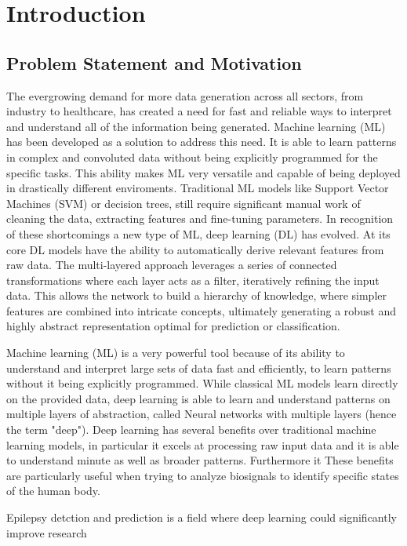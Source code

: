 \section{Introduction}

\subsection{Problem Statement and Motivation}







The evergrowing demand for more data generation across all sectors, from industry to healthcare,
has created a need for fast and reliable ways to interpret and understand all of the information 
being generated. Machine learning (ML) has been developed as a solution to address this need. It 
is able to learn patterns in complex and convoluted data without being explicitly programmed for
the specific tasks. This ability makes ML very versatile and capable of being deployed in drastically
different enviroments. Traditional ML models like Support Vector Machines (SVM) or decision trees,
still require significant manual work of cleaning the data, extracting features and fine-tuning parameters.
In recognition of these shortcomings a new type of ML, deep learning (DL) has evolved.
At its core DL models have the ability to automatically derive relevant features from raw data.
The multi-layered approach leverages a series of connected transformations where each layer acts as a filter, 
iteratively refining the input data. This allows the network to build a hierarchy of knowledge, 
where simpler features are combined into intricate concepts, 
ultimately generating a robust and highly abstract representation optimal for prediction or classification.



Machine learning (ML) is a very powerful tool because of its ability to understand and interpret
large sets of data fast and efficiently, to learn patterns without it being explicitly programmed.
While classical ML models learn directly on the provided data,
deep learning is able to learn and understand patterns on multiple layers of abstraction,
called Neural networks with multiple layers (hence the term "deep").
Deep learning has several benefits over traditional machine learning models,
in particular it excels at processing raw input data and it is able
to understand minute as well as broader patterns.
Furthermore it 
These benefits are particularly useful when trying to analyze biosignals to
identify specific states of the human body.

Epilepsy detction and prediction is a field where deep learning could
significantly improve research 